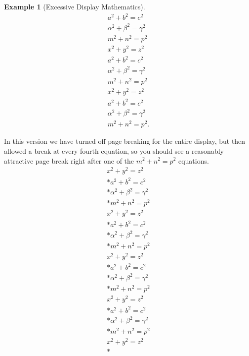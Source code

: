 \documentclass{amsart}
\theoremstyle{plain}%
\theoremstyle{definition}%
\newtheorem{example}[theorem]{Example}
\theoremstyle{remark}%
\numberwithin{equation}{section}
\begin{document}
\begin{example}[Excessive Display Mathematics]
\begin{gather*}
a^2+b^2=c^2\\
\alpha^2+\beta^2=\gamma^2\\
m^2+n^2=p^2\\
x^2+y^2=z^2\\
a^2+b^2=c^2\\
\alpha^2+\beta^2=\gamma^2\\
m^2+n^2=p^2\\
x^2+y^2=z^2\\
a^2+b^2=c^2\\
\alpha^2+\beta^2=\gamma^2\\
m^2+n^2=p^2\text{.}
\end{gather*}
%
\par
In this version we have turned off page breaking for the entire display, but then allowed a break at every fourth equation, so you should see a reasonably attractive page break right after one of the \(m^2+n^2=p^2\) equations.%
\begin{gather}
x^2+y^2=z^2\label{section-mathematics-4-9-3-2-1}\\*
a^2+b^2=c^2\label{section-mathematics-4-9-3-2-2}\\*
\alpha^2+\beta^2=\gamma^2\label{section-mathematics-4-9-3-2-3}\\*
m^2+n^2=p^2\label{section-mathematics-4-9-3-2-4}\\
x^2+y^2=z^2\label{section-mathematics-4-9-3-2-5}\\*
a^2+b^2=c^2\label{section-mathematics-4-9-3-2-6}\\*
\alpha^2+\beta^2=\gamma^2\label{section-mathematics-4-9-3-2-7}\\*
m^2+n^2=p^2\label{section-mathematics-4-9-3-2-8}\\
x^2+y^2=z^2\label{section-mathematics-4-9-3-2-9}\\*
a^2+b^2=c^2\label{section-mathematics-4-9-3-2-10}\\*
\alpha^2+\beta^2=\gamma^2\label{section-mathematics-4-9-3-2-11}\\*
m^2+n^2=p^2\label{section-mathematics-4-9-3-2-12}\\
x^2+y^2=z^2\label{section-mathematics-4-9-3-2-13}\\*
a^2+b^2=c^2\label{section-mathematics-4-9-3-2-14}\\*
\alpha^2+\beta^2=\gamma^2\label{section-mathematics-4-9-3-2-15}\\*
m^2+n^2=p^2\label{section-mathematics-4-9-3-2-16}\\
x^2+y^2=z^2\label{section-mathematics-4-9-3-2-17}\\*

\end{gather}
\end{example}
\end{document}
